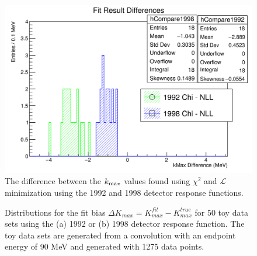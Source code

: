 \begin{figure}[h]
  \centering
  \includegraphics[width=0.8\linewidth]{figures/png/compare_fit_results_92_v_98_unrestrictedOnly.png}
  \caption{The difference between the $\mbox{$k_{\rm max}$}$ values found using $\chi^2$ and
    $\mathcal{L}$ minimization using the 1992 and 1998 detector response functions.}
  \label{fig:compareFits}
\end{figure}

\begin{figure}[h]
  \centering
  \hfill
  \caption{Distributions for the fit bias $\Delta{K_{max}} = K_{max}^{fit}-K_{max}^{true}$ for 50 toy %
    data sets using the (a) 1992 or (b) 1998 detector response function.
    The toy data sets are generated from a convolution with an endpoint energy of 90 MeV
    and generated with 1275 data points.
  }
  \label{fig:ToyFitErrs}
\end{figure}

